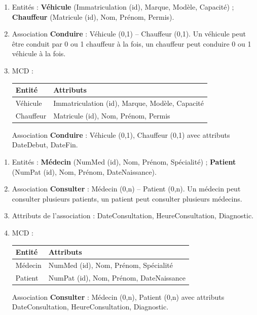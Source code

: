 \begin{enumerate}
    \item Entités : \textbf{Véhicule} (Immatriculation (id), Marque, Modèle, Capacité) ; \textbf{Chauffeur} (Matricule (id), Nom, Prénom, Permis).
    \item Association \textbf{Conduire} : Véhicule (0,1) -- Chauffeur (0,1). Un véhicule peut être conduit par 0 ou 1 chauffeur à la fois, un chauffeur peut conduire 0 ou 1 véhicule à la fois.
    \item MCD :
    \begin{center}
    \begin{tabular}{|l|l|}
    \hline
    \textbf{Entité} & \textbf{Attributs} \\
    \hline
    Véhicule & Immatriculation (id), Marque, Modèle, Capacité \\
    \hline
    Chauffeur & Matricule (id), Nom, Prénom, Permis \\
    \hline
    \end{tabular}
    \end{center}
    Association \textbf{Conduire} : Véhicule (0,1), Chauffeur (0,1) avec attributs DateDebut, DateFin.
\end{enumerate}

\begin{enumerate}
    \item Entités : \textbf{Médecin} (NumMed (id), Nom, Prénom, Spécialité) ; \textbf{Patient} (NumPat (id), Nom, Prénom, DateNaissance).
    \item Association \textbf{Consulter} : Médecin (0,n) -- Patient (0,n). Un médecin peut consulter plusieurs patients, un patient peut consulter plusieurs médecins.
    \item Attributs de l'association : DateConsultation, HeureConsultation, Diagnostic.
    \item MCD :
    \begin{center}
    \begin{tabular}{|l|l|}
    \hline
    \textbf{Entité} & \textbf{Attributs} \\
    \hline
    Médecin & NumMed (id), Nom, Prénom, Spécialité \\
    \hline
    Patient & NumPat (id), Nom, Prénom, DateNaissance \\
    \hline
    \end{tabular}
    \end{center}
    Association \textbf{Consulter} : Médecin (0,n), Patient (0,n) avec attributs DateConsultation, HeureConsultation, Diagnostic.
\end{enumerate}

